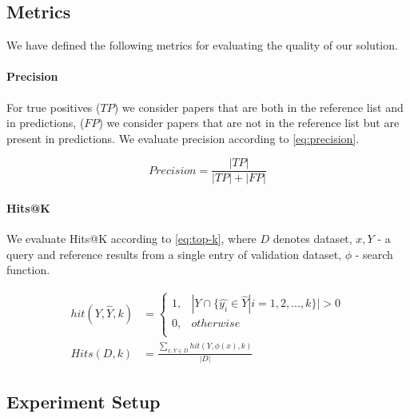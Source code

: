 \documentclass{article}
\begin{document}
    \subsection{Metrics}
    
        We have defined the following metrics for evaluating the quality of our solution.

        \paragraph{Precision}
       
            For true positives (\(TP\)) we consider papers that are both in the reference list and in predictions, (\(FP\)) we consider papers that are not in the reference list but are present in predictions. We evaluate precision according to \ref{eq:precision}.


            \begin{equation}
                Precision = \frac{|TP|}{|TP| + |FP|}
                \label{eq:precision}
            \end{equation}

        \paragraph{Hits@K}
       
            We evaluate Hits@K according to \ref{eq:top-k}, where \(D\) denotes dataset, \(x, Y\) - a query and reference results from a single entry of validation dataset, \(\phi\) - search function.

            \begin{equation}
                \begin{split}
                    hit(Y, \hat{Y}, k) &= \left\{\begin{matrix}
                        1, & | Y \cap \{\hat{y_{i}} \in \hat{Y} | i=1,2,...,k\} | > 0 \\
                        0, & otherwise \\
                       \end{matrix}\right. \\ 
                    Hits(D, k) &= \frac{\sum_{x, Y \in D} hit(Y, \phi(x), k)}{|D|}
                \end{split}
                \label{eq:top-k}
            \end{equation}

    \subsection{Experiment Setup}
        
\end{document}
